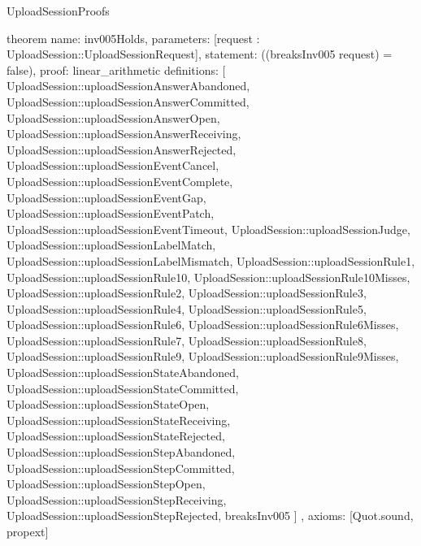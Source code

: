 \begin{lexlean}{UploadSessionProofs}
\begin{semanticmodule}
theorem{
  name: inv005Holds,
  parameters: [request : UploadSession::UploadSessionRequest],
  statement: ((breaksInv005 request) = false),
  proof: linear_arithmetic{
    definitions: [
      UploadSession::uploadSessionAnswerAbandoned,
      UploadSession::uploadSessionAnswerCommitted,
      UploadSession::uploadSessionAnswerOpen,
      UploadSession::uploadSessionAnswerReceiving,
      UploadSession::uploadSessionAnswerRejected,
      UploadSession::uploadSessionEventCancel,
      UploadSession::uploadSessionEventComplete,
      UploadSession::uploadSessionEventGap,
      UploadSession::uploadSessionEventPatch,
      UploadSession::uploadSessionEventTimeout,
      UploadSession::uploadSessionJudge,
      UploadSession::uploadSessionLabelMatch,
      UploadSession::uploadSessionLabelMismatch,
      UploadSession::uploadSessionRule1,
      UploadSession::uploadSessionRule10,
      UploadSession::uploadSessionRule10Misses,
      UploadSession::uploadSessionRule2,
      UploadSession::uploadSessionRule3,
      UploadSession::uploadSessionRule4,
      UploadSession::uploadSessionRule5,
      UploadSession::uploadSessionRule6,
      UploadSession::uploadSessionRule6Misses,
      UploadSession::uploadSessionRule7,
      UploadSession::uploadSessionRule8,
      UploadSession::uploadSessionRule9,
      UploadSession::uploadSessionRule9Misses,
      UploadSession::uploadSessionStateAbandoned,
      UploadSession::uploadSessionStateCommitted,
      UploadSession::uploadSessionStateOpen,
      UploadSession::uploadSessionStateReceiving,
      UploadSession::uploadSessionStateRejected,
      UploadSession::uploadSessionStepAbandoned,
      UploadSession::uploadSessionStepCommitted,
      UploadSession::uploadSessionStepOpen,
      UploadSession::uploadSessionStepReceiving,
      UploadSession::uploadSessionStepRejected,
      breaksInv005
    ]
  },
  axioms: [Quot.sound, propext]
}
\end{semanticmodule}
\end{lexlean}
